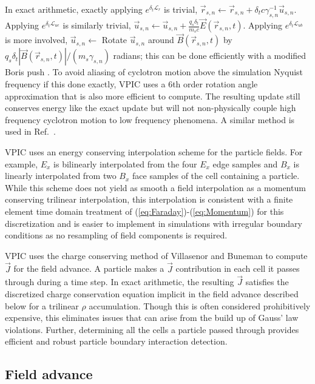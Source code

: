 \documentclass[letter,10pt]{article}
\newcommand{\vecr}{\vec{r}}
\newcommand{\vecu}{\vec{u}}
\newcommand{\vecJ}{\vec{J}}
\newcommand{\vecE}{\vec{E}}
\newcommand{\vecB}{\vec{B}}
\newcommand{\op}{\mathcal{L}}
\newcommand{\eq}[1]{(\ref{eq:#1})}
\begin{document}
In exact arithmetic, exactly applying $e^{\delta_t\op_r}$ is trivial,
$\vecr_{s,n} \leftarrow \vecr_{s,n} + \delta_t
c\gamma_{s,n}^{-1}\vecu_{s,n}$.  Applying $e^{\delta_t\op_{ue}}$ is
similarly trivial, $\vecu_{s,n}\leftarrow\vecu_{s,n} +
\frac{q_s\delta_t}{m_s c}\vecE\left(\vecr_{s,n},t\right)$.
Applying $e^{\delta_t\op_{ub}}$ is more involved, $\vecu_{s,n}
\leftarrow$ Rotate $\vecu_{s,n}$ around
$\vecB\left(\vecr_{s,n},t\right)$ by
$q_s\delta_t\left|\vecB\left(\vecr_{s,n},t\right)\right| /
\left(m_s\gamma_{s,n}\right)$ radians; this can be done efficiently
with a modified Boris push \cite{Boris_1970}.  To avoid aliasing of
cyclotron motion above the simulation Nyquist frequency if this done
exactly, VPIC uses a 6th order rotation angle approximation that is
also more efficient to compute.  The resulting update still conserves
energy like the exact update but will not non-physically couple high
frequency cyclotron motion to low frequency phenomena.  A similar
method is used in Ref.~\cite{Blahovec_et_al_2000}.

VPIC uses an energy conserving interpolation scheme for the particle
fields.  For example, $E_x$ is bilinearly interpolated from the four
$E_x$ edge samples and $B_x$ is linearly interpolated from two $B_x$
face samples of the cell containing a particle.  While this scheme
does not yield as smooth a field interpolation as a momentum
conserving trilinear interpolation, this interpolation is consistent
with a finite element time domain treatment of
\eq{Faraday}-\eq{Momentum} for this discretization
\cite{Eastwood_et_al_1995} and is easier to implement in simulations
with irregular boundary conditions as no resampling of field
components is required.

VPIC uses the charge conserving method of Villasenor and Buneman
\cite{Villasenor_Buneman_1992} to compute $\vecJ$ for the
field advance.  A particle makes a $\vecJ$ contribution in each cell
it passes through during a time step.  In exact arithmetic, the
resulting $\vecJ$ satisfies the discretized charge conservation
equation implicit in the field advance described below for a trilinear
$\rho$ accumulation.  Though this is often considered prohibitively
expensive, this eliminates issues that can arise from the build up of
Gauss' law violations.  Further, determining all the cells a particle
passed through provides efficient and robust particle boundary
interaction detection.

\subsection{Field advance}
\end{document}
